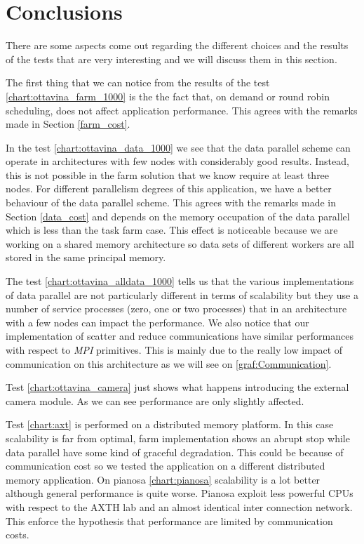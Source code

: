 \section{Conclusions}

There are some aspects come out regarding the different choices and the results of the tests that are very interesting and we will discuss them in this section.

The first thing that we can notice from the results of the test \ref{chart:ottavina_farm_1000} is the the fact that, on demand or round robin scheduling, does not affect application performance.
This agrees with the remarks made in Section \ref{farm_cost}.

In the test \ref{chart:ottavina_data_1000} we see that the data parallel scheme can operate in architectures with few nodes with considerably good results.
Instead, this is not possible in the farm solution that we know require at least three nodes. 
For different parallelism degrees of this application, we have a better behaviour of the data parallel scheme. 
This agrees with the remarks made in Section \ref{data_cost} and depends on the memory occupation of the data parallel which is less than the task farm case. 
This effect is noticeable because we are working on a shared memory architecture so data sets of different workers are all stored in the same principal memory.

The test \ref{chart:ottavina_alldata_1000} tells us that the various implementations of data parallel are not particularly different in terms of scalability but they use a number of service processes (zero, one or two processes) that in an architecture with a few nodes can impact the performance.
We also notice that our implementation of scatter and reduce communications have similar performances with respect to \textit{MPI} primitives.
This is mainly due to the really low impact of communication on this architecture as we will see on \ref{graf:Communication}.

Test \ref{chart:ottavina_camera} just shows what happens introducing the external camera module. 
As we can see performance are only slightly affected.

Test \ref{chart:axt} is performed on a distributed memory platform. 
In this case scalability is far from optimal, farm implementation shows an abrupt stop while data parallel have some kind of graceful degradation.
This could be because of communication cost so we tested the application on a different distributed memory application.
On pianosa \ref{chart:pianosa} scalability is a lot better although general performance is quite worse.
Pianosa exploit less powerful CPUs with respect to the AXTH lab and an almost identical inter connection network.
This enforce the hypothesis that performance are limited by communication costs.

